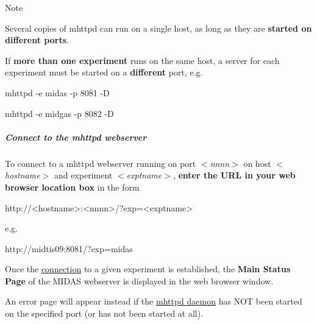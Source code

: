\begin{DoxyNote}{Note}

\begin{DoxyItemize}
\item Several copies of mhttpd can run on a single host, as long as they are {\bfseries started on different ports}.
\item If {\bfseries more than one experiment} runs on the same host, a server for each experiment must be started on a {\bfseries different} port, e.g.
\begin{DoxyItemize}
\item mhttpd -\/e midas -\/p 8081 -\/D
\item mhttpd -\/e midgas -\/p 8082 -\/D
\end{DoxyItemize}
\end{DoxyItemize}
\end{DoxyNote}
\par


\par


\label{RC_mhttpd_utility_idx_mhttpd-utility_connect}
\hypertarget{RC_mhttpd_utility_idx_mhttpd-utility_connect}{}
 \hypertarget{RC_mhttpd_utility_RC_mhttpd_connect}{}\subparagraph{Connect to the mhttpd webserver}\label{RC_mhttpd_utility_RC_mhttpd_connect}
To connect to a mhttpd webserver running on port {\itshape $<$nnnn$>$\/} on host {\itshape $<$hostname$>$\/} and experiment {\itshape $<$exptname$>$\/}, {\bfseries enter the URL in your web browser location box} in the form


\begin{DoxyCode}
 http://<hostname>:<nnnn>/?exp=<exptname>
\end{DoxyCode}
 e.g. 
\begin{DoxyCode}
 http://midtis09:8081/?exp=midas
\end{DoxyCode}
 \par


\label{RC_mhttpd_utility_RC_mhttpd_msp_default}
\hypertarget{RC_mhttpd_utility_RC_mhttpd_msp_default}{}


Once the \hyperlink{RC_mhttpd_utility_RC_mhttpd_connect}{connection} to a given experiment is established, the {\bfseries Main Status Page} of the MIDAS webserver is displayed in the web browser window. \par
 An error page will appear instead if the \hyperlink{RC_mhttpd_utility}{mhttpd daemon} has NOT been started on the specified port (or has not been started at all). \par


